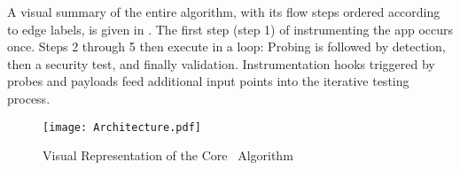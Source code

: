 A visual summary of the entire algorithm, with its flow steps ordered according to edge labels, is given in . The first step (step 1) of instrumenting the app occurs once. Steps 2 through 5 then execute in a loop: Probing is followed by detection, then a security test, and finally validation. Instrumentation hooks triggered by probes and payloads feed additional input points into the iterative testing process.

\begin{figure}
	\texttt{[image: Architecture.pdf]}
\caption{\label{Fi:architecture}Visual Representation of the Core \Tool\ Algorithm}
\end{figure} 